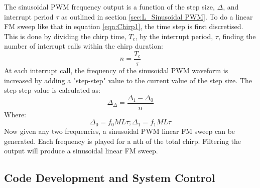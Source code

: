 \documentclass[12pt, a4paper]{article}
\begin{document}
The sinusoidal PWM frequency output is a function of the step size, $\Delta$, and interrupt period $\tau$ as outlined in section \ref{sec:L_Sinusoidal PWM}. To do a linear FM sweep like that in equation \ref{eqn:Chirp1}, the time step is first discretised. This is done by dividing the chirp time, $T_c$, by the interrupt period, $\tau$, finding the number of interrupt calls within the chirp duration: \\
\begin{equation}
	n = \frac{T_c}{\tau}
\end{equation}
At each interrupt call, the frequency of the sinusoidal PWM waveform is increased by adding a "step-step" value to the current value of the step size. The step-step value is calculated as:
\begin{equation}
	\Delta_\Delta = \frac{\Delta_1 - \Delta_0}{n} 
\end{equation}
Where:
\begin{equation*}
	\Delta_0 = f_0ML\tau; \Delta_1 = f_1ML\tau
\end{equation*}
Now given any two frequencies, a sinusoidal PWM linear FM sweep can be generated. Each frequency is played for a nth of the total chirp. Filtering the output will produce a sinusoidal linear FM sweep. \\



\subsection{Code Development and System Control}
\end{document}
